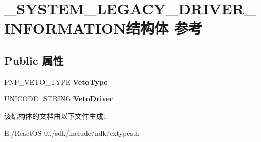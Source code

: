 \hypertarget{struct___s_y_s_t_e_m___l_e_g_a_c_y___d_r_i_v_e_r___i_n_f_o_r_m_a_t_i_o_n}{}\section{\+\_\+\+S\+Y\+S\+T\+E\+M\+\_\+\+L\+E\+G\+A\+C\+Y\+\_\+\+D\+R\+I\+V\+E\+R\+\_\+\+I\+N\+F\+O\+R\+M\+A\+T\+I\+O\+N结构体 参考}
\label{struct___s_y_s_t_e_m___l_e_g_a_c_y___d_r_i_v_e_r___i_n_f_o_r_m_a_t_i_o_n}
\subsection*{Public 属性}
\begin{DoxyCompactItemize}
\item 
\mbox{\label{struct___s_y_s_t_e_m___l_e_g_a_c_y___d_r_i_v_e_r___i_n_f_o_r_m_a_t_i_o_n_aa76dc56b662e25a8848c3cd4ba7262cb}} 
P\+N\+P\+\_\+\+V\+E\+T\+O\+\_\+\+T\+Y\+PE {\bfseries Veto\+Type}
\item 
\mbox{\label{struct___s_y_s_t_e_m___l_e_g_a_c_y___d_r_i_v_e_r___i_n_f_o_r_m_a_t_i_o_n_aff4ca90bbf750cdda6afb7ae6344e022}} 
\hyperlink{struct___u_n_i_c_o_d_e___s_t_r_i_n_g}{U\+N\+I\+C\+O\+D\+E\+\_\+\+S\+T\+R\+I\+NG} {\bfseries Veto\+Driver}
\end{DoxyCompactItemize}


该结构体的文档由以下文件生成\+:\begin{DoxyCompactItemize}
\item 
E\+:/\+React\+O\+S-\/0../sdk/include/ndk/extypes.\+h\end{DoxyCompactItemize}
